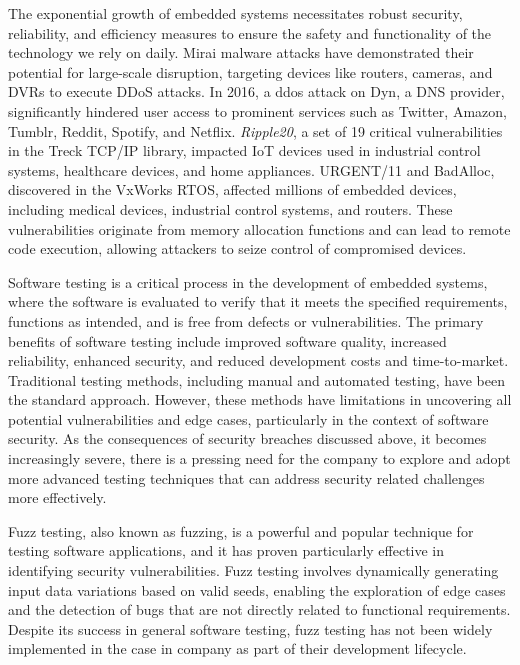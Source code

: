 The exponential growth of embedded systems necessitates robust security, reliability, and
efficiency measures to ensure the safety and functionality of the technology we rely on daily\cite{muench2018you}.
Mirai malware attacks have demonstrated their potential for large-scale disruption, targeting
devices like routers, cameras, and DVRs to execute \gls{DDoS} attacks.
In 2016, a \gls{ddos} attack on Dyn, a DNS provider, significantly hindered user access to prominent
services such as Twitter, Amazon, Tumblr, Reddit, Spotify, and
Netflix\cite{muench2018you}\cite{lindqvist2017future}. \textit{Ripple20},
a set of 19 critical vulnerabilities in the Treck TCP/IP library,
impacted IoT devices used in industrial control systems, healthcare devices,
and home appliances. URGENT/11 and BadAlloc, discovered in the VxWorks \gls{RTOS},
affected millions of embedded devices, including medical devices, industrial control systems,
and routers\cite{seri2019critical}. These vulnerabilities originate from memory allocation functions
and can lead to remote code execution, allowing attackers to seize control of compromised devices.

Software testing is a critical process in the development of embedded systems,
where the software is evaluated to verify that it meets the specified requirements,
functions as intended, and is free from defects or vulnerabilities. The primary benefits of
software testing include improved software quality, increased reliability, enhanced security,
and reduced development costs and time-to-market\cite{819971}. Traditional testing methods,
including manual and automated testing, have been the standard approach.
However, these methods have limitations in uncovering all potential vulnerabilities and edge cases, particularly in the context of
software security. As the consequences of security breaches discussed above, it becomes increasingly severe,
there is a pressing need for the company to explore and adopt more
advanced testing techniques that can address security related challenges more effectively.

Fuzz testing, also known as fuzzing, is a powerful and popular technique for testing software
applications, and it has proven particularly effective in identifying security vulnerabilities.
Fuzz testing involves dynamically generating input data variations based on valid seeds,
enabling the exploration of edge cases and the detection of bugs that are not directly
related to functional requirements\cite{9787842}. Despite its success in general software testing,
fuzz testing has not been widely implemented in the case in company as part of their development lifecycle.

